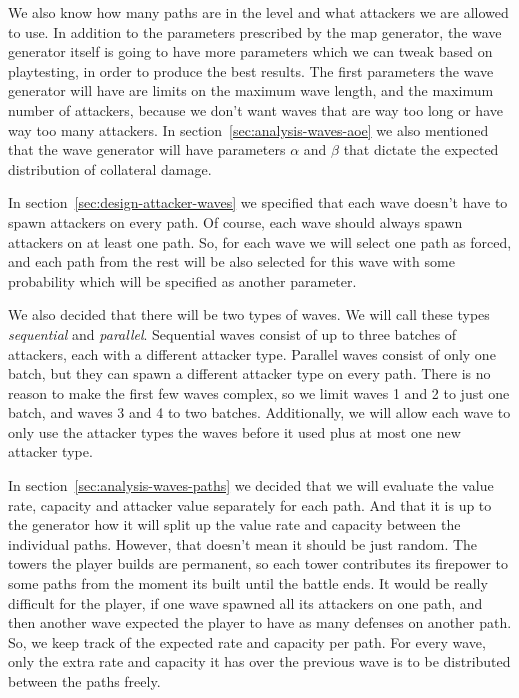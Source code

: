 We also know how many paths are in the level and what attackers we are allowed to use.
In addition to the parameters prescribed by the map generator, the wave generator itself is going to have more parameters which we can tweak based on playtesting, in order to produce the best results.
The first parameters the wave generator will have are limits on the maximum wave length, and the maximum number of attackers, because we don't want waves that are way too long or have way too many attackers.
In section~\ref{sec:analysis-waves-aoe} we also mentioned that the wave generator will have parameters $\alpha$ and $\beta$ that dictate the expected distribution of collateral damage.

In section~\ref{sec:design-attacker-waves} we specified that each wave doesn't have to spawn attackers on every path.
Of course, each wave should always spawn attackers on at least one path.
So, for each wave we will select one path as forced, and each path from the rest will be also selected for this wave with some probability which will be specified as another parameter.

We also decided that there will be two types of waves.
We will call these types \emph{sequential} and \emph{parallel}.
Sequential waves consist of up to three batches of attackers, each with a different attacker type.
Parallel waves consist of only one batch, but they can spawn a different attacker type on every path.
There is no reason to make the first few waves complex, so we limit waves 1 and 2 to just one batch, and waves 3 and 4 to two batches.
Additionally, we will allow each wave to only use the attacker types the waves before it used plus at most one new attacker type.

In section~\ref{sec:analysis-waves-paths} we decided that we will evaluate the value rate, capacity and attacker value separately for each path.
And that it is up to the generator how it will split up the value rate and capacity between the individual paths.
However, that doesn't mean it should be just random.
The towers the player builds are permanent, so each tower contributes its firepower to some paths from the moment its built until the battle ends.
It would be really difficult for the player, if one wave spawned all its attackers on one path, and then another wave expected the player to have as many defenses on another path.
So, we keep track of the expected rate and capacity per path.
For every wave, only the extra rate and capacity it has over the previous wave is to be distributed between the paths freely.

